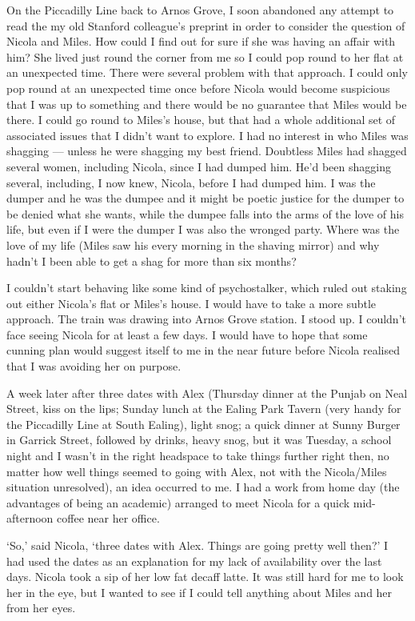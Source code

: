 On the Piccadilly Line back to Arnos Grove, I soon abandoned any attempt to read the my old Stanford colleague's preprint in order to consider the question of Nicola and Miles. How could I find out for sure if she was having an affair with him? She lived just round the corner from me so I
could pop round to her flat at an unexpected time. There were several problem with
that approach. I could only pop round at an unexpected time once before Nicola would
become suspicious that I was up to something and there would be
no guarantee that Miles would be there. I could go round to
Miles's house, but that had a whole additional set of associated issues that I
didn't want to explore. I had no interest in who Miles was shagging
--- unless he were shagging my best friend. Doubtless Miles had shagged several women, including Nicola, since I had dumped him. He'd been shagging several, including, I now knew, Nicola, before I had dumped him. I was the dumper and he was the dumpee and it might be poetic justice for the dumper to be denied what she wants,
while the dumpee falls into the arms of the love of his life, but even if I were the dumper I was also the wronged party. Where was the love of {\twelveit my\/} life (Miles saw his every morning in the shaving mirror) and why hadn't I been able to get a shag for more than six months?

I couldn't start behaving like some kind of psychostalker, which ruled out staking out either Nicola's flat or Miles's house. I would have to take a more subtle approach. The train was drawing into Arnos Grove station. I stood up. I couldn't face seeing Nicola for at least a few days. I would have to hope that some cunning plan would suggest itself to me in the near future before Nicola realised that I was avoiding her on purpose.

\majorbreak
A week later after three dates with Alex (Thursday dinner at the Punjab on Neal Street, kiss on the lips; Sunday lunch at the Ealing Park Tavern (very handy for the Piccadilly Line at South Ealing), light snog; a quick dinner at Sunny Burger in Garrick Street, followed by drinks, heavy snog, but it was Tuesday, a school night and I wasn't in the right headspace to take things further right then, no matter how well things seemed to going with Alex, not with the Nicola/Miles situation unresolved), an idea occurred to me. I had a work from home day (the advantages of being an academic) arranged to meet Nicola for a quick mid-afternoon coffee near her office.

`So,' said Nicola, `three dates with Alex. Things are going pretty well then?' I had used the dates as an explanation for my lack of availability over the last days. Nicola took a sip of her low fat decaff latte. It was still hard for me to look her in the eye, but I wanted to see if I could tell anything about Miles and her from her eyes.

